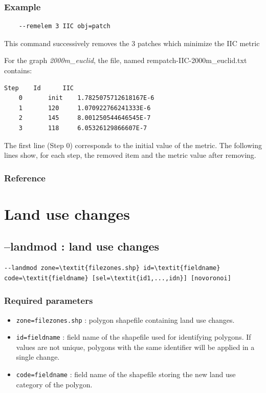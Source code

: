 \documentclass[a4paper,10pt]{report}
\begin{document}
\subsubsection{Example}

\begin{Verbatim}
	--remelem 3 IIC obj=patch
\end{Verbatim}
This command  successively removes the 3 patches which minimize the IIC metric

For the graph \textit{2000m\_euclid}, the file, named rempatch-IIC-2000m\_euclid.txt contains:
\begin{Verbatim}[tabsize=4]
	Step	Id  	IIC
	0   	init	1.7825075712618167E-6
	1   	120 	1.070922766241333E-6
	2   	145 	8.001250544646545E-7
	3   	118 	6.05326129866607E-7
\end{Verbatim}
The first line (Step 0) corresponds to the initial value of the metric. The following lines show, for each step, the removed item and the metric value after removing.

\subsubsection{Reference}
\cite{2016_campagnole}


\section{Land use changes}
\subsection{--landmod : land use changes}

\begin{Verbatim}[commandchars=\\\{\}]
--landmod zone=\textit{filezones.shp} id=\textit{fieldname} code=\textit{fieldname} [sel=\textit{id1,...,idn}] [novoronoi]
\end{Verbatim}

\subsubsection{Required parameters}
\begin{itemize}
	\item \verb|zone=filezones.shp| : polygon shapefile containing land use changes.
	\item \verb|id=fieldname| : field name of the shapefile used for identifying polygons. If values are not unique, polygons with the same identifier will be applied in a single change.
	\item \verb|code=fieldname| : field name of the shapefile storing the new land use category of the polygon.
\end{itemize}
\end{document}
